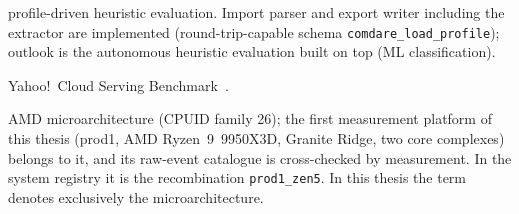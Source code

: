 \begin{description}
  profile-driven heuristic evaluation. Import parser and export writer including the extractor are
  implemented (round-trip-capable schema \texttt{comdare\_load\_profile}); outlook is the
  autonomous heuristic evaluation built on top (ML classification).
  \item[YCSB] Yahoo!\ Cloud Serving Benchmark~\cite{cooper2010ycsb}.
  \item[Zen~5] AMD microarchitecture (CPUID family 26); the first measurement platform of this
  thesis (prod1, AMD Ryzen~9~9950X3D, Granite Ridge, two core complexes) belongs to it, and its %
  raw-event catalogue is cross-checked by measurement. In the system registry it is the
  recombination \texttt{prod1\_zen5}. In this thesis the term denotes exclusively the
  microarchitecture.
\end{description}
